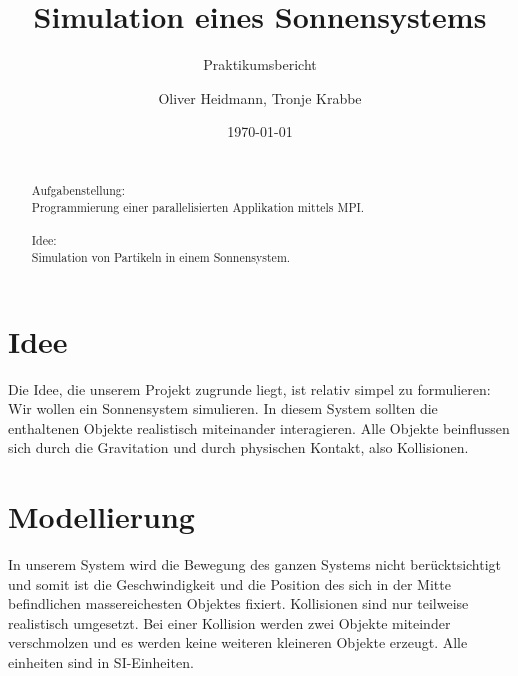 \title{Simulation eines Sonnensystems}
\subtitle{Praktikumsbericht}

\author{Oliver Heidmann, Tronje Krabbe}

  
\date{\today}

\maketitle

\newpage
\begin{abstract}
\quad \\
Aufgabenstellung: \\
Programmierung einer parallelisierten Applikation mittels MPI. \\ \\
Idee: \\
Simulation von Partikeln in einem Sonnensystem.
\end{abstract}

\tableofcontents
\newpage
\section{Idee}
Die Idee, die unserem Projekt zugrunde liegt, ist relativ simpel zu formulieren:
Wir wollen ein Sonnensystem simulieren. In diesem System sollten die enthaltenen
Objekte realistisch miteinander interagieren. Alle Objekte beinflussen sich durch
die Gravitation und durch physischen Kontakt, also Kollisionen. 

\section{Modellierung}
In unserem System
wird die Bewegung des ganzen Systems nicht berücktsichtigt und somit ist die 
Geschwindigkeit und die Position des sich in der Mitte befindlichen massereichesten
Objektes fixiert.
Kollisionen sind nur teilweise realistisch umgesetzt. Bei einer Kollision werden
zwei Objekte miteinder verschmolzen und es werden keine weiteren kleineren Objekte
erzeugt.
Alle einheiten sind in SI-Einheiten.


